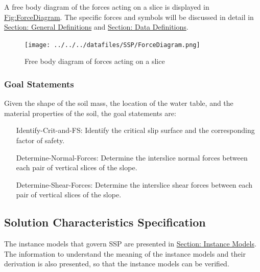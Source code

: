 \documentclass[12pt]{article}
\begin{document}
A free body diagram of the forces acting on a slice is displayed in \hyperref[Figure:ForceDiagram]{Fig:ForceDiagram}. The specific forces and symbols will be discussed in detail in \hyperref[Sec:GDs]{Section: General Definitions} and \hyperref[Sec:DDs]{Section: Data Definitions}.
\begin{figure}
\begin{center}
\texttt{[image: ../../../datafiles/SSP/ForceDiagram.png]}
\caption{Free body diagram of forces acting on a slice}
\label{Figure:ForceDiagram}
\end{center}
\end{figure}
\subsubsection{Goal Statements}
\label{Sec:GoalStmt}
Given the shape of the soil mass, the location of the water table, and the material properties of the soil, the goal statements are:
\begin{itemize}
\item[Identify-Crit-and-FS:\phantomsection\label{identifyCritAndFS}]Identify the critical slip surface and the corresponding factor of safety.
\item[Determine-Normal-Forces:\phantomsection\label{determineNormalF}]Determine the interslice normal forces between each pair of vertical slices of the slope.
\item[Determine-Shear-Forces:\phantomsection\label{determineShearF}]Determine the interslice shear forces between each pair of vertical slices of the slope.
\end{itemize}
\subsection{Solution Characteristics Specification}
\label{Sec:SolCharSpec}
The instance models that govern SSP are presented in \hyperref[Sec:IMs]{Section: Instance Models}. The information to understand the meaning of the instance models and their derivation is also presented, so that the instance models can be verified.
\end{document}
